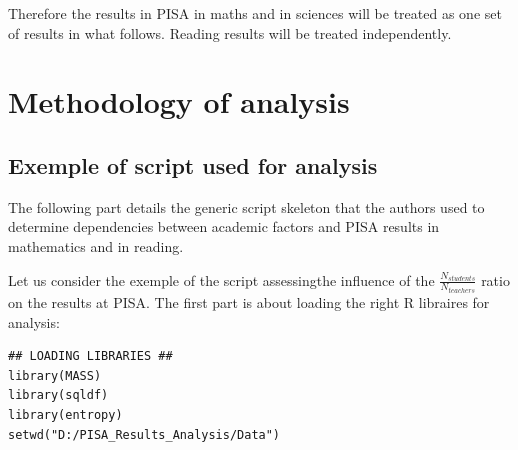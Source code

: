 \documentclass[12pt,a4paper]{article}
\begin{document}
Therefore the results in PISA in maths and in sciences will be treated as one set of results in what follows. Reading results will be treated independently.

\section{Methodology of analysis}

\subsection{Exemple of script used for analysis}

The following part details the generic script skeleton that the authors used to determine dependencies between academic factors and PISA results in mathematics and in reading.

Let us consider the exemple of the script assessingthe influence of the $\frac{N_{students}}{N_{teachers}}$ ratio on the results at PISA.
The first part is about loading the right R libraires for analysis:
\begin{lstlisting}
## LOADING LIBRARIES ##
library(MASS)
library(sqldf)
library(entropy)
setwd("D:/PISA_Results_Analysis/Data")
\end{lstlisting}
\end{document}
